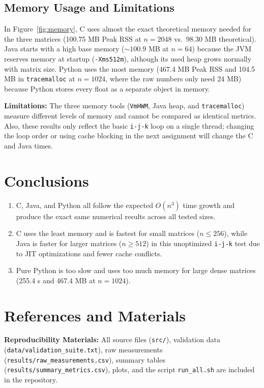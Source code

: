 \documentclass[11pt,a4paper]{article}
\begin{document}
\subsection{Memory Usage and Limitations}
In Figure~\ref{fig:memory}, C uses almost the exact theoretical memory needed for the three matrices (100.75 MB Peak RSS at $n=2048$ vs.\ 98.30 MB theoretical). Java starts with a high base memory ($\sim 100.9$ MB at $n=64$) because the JVM reserves memory at startup (\texttt{-Xms512m}), although its used heap grows normally with matrix size. Python uses the most memory (467.4 MB Peak RSS and 104.5 MB in \texttt{tracemalloc} at $n=1024$, where the raw numbers only need 24 MB) because Python stores every float as a separate object in memory.

\textbf{Limitations:} The three memory tools (\texttt{VmHWM}, Java heap, and \texttt{tracemalloc}) measure different levels of memory and cannot be compared as identical metrics. Also, these results only reflect the basic \texttt{i-j-k} loop on a single thread; changing the loop order or using cache blocking in the next assignment will change the C and Java times.

\section{Conclusions}
\begin{enumerate}
    \item C, Java, and Python all follow the expected $O(n^3)$ time growth and produce the exact same numerical results across all tested sizes.
    \item C uses the least memory and is fastest for small matrices ($n \le 256$), while Java is faster for larger matrices ($n \ge 512$) in this unoptimized \texttt{i-j-k} test due to JIT optimizations and fewer cache conflicts.
    \item Pure Python is too slow and uses too much memory for large dense matrices (255.4 s and 467.4 MB at $n=1024$).
\end{enumerate}

\section*{References and Materials}
\textbf{Reproducibility Materials:} All source files (\texttt{src/}), validation data (\texttt{data/validation\_suite.txt}), raw measurements (\texttt{results/raw\_measurements.csv}), summary tables (\texttt{results/summary\_metrics.csv}), plots, and the script \texttt{run\_all.sh} are included in the repository.
\end{document}
